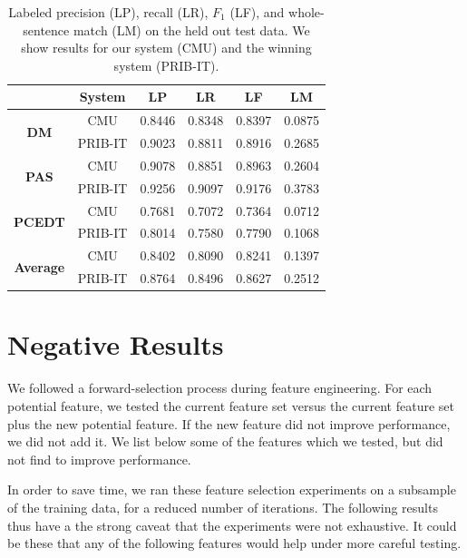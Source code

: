 \documentclass[11pt]{article}
\begin{document}
\begin{table}
\begin{center}
\begin{tabular*}{\textwidth}%
{@{\extracolsep{\fill}}cc|cccc}%
 & System & LP & LR & LF & LM \\
\hline
\hline
\multirow{2}{*}{\textbf{DM}}
& CMU & 0.8446 & 0.8348 & 0.8397 & 0.0875 \\
& PRIB-IT & 0.9023 & 0.8811 & 0.8916 & 0.2685 \\
\hline
\multirow{2}{*}{\textbf{PAS}}
& CMU & 0.9078 & 0.8851 & 0.8963 & 0.2604 \\
& PRIB-IT & 0.9256 & 0.9097 & 0.9176 & 0.3783 \\
\hline
\multirow{2}{*}{\textbf{PCEDT}}
& CMU & 0.7681 & 0.7072 & 0.7364 & 0.0712 \\
& PRIB-IT & 0.8014 & 0.7580 & 0.7790 & 0.1068 \\
\hline
\hline
\multirow{2}{*}{\textbf{Average}}
& CMU & 0.8402 & 0.8090 & 0.8241 & 0.1397 \\
& PRIB-IT & 0.8764 & 0.8496 & 0.8627 & 0.2512 \\
\end{tabular*}
\caption{Labeled precision (LP), recall (LR), $F_1$ (LF), and
whole-sentence match (LM) on the held out test data.
We show results for our system (CMU) and the winning system (PRIB-IT).
}
\label{table:perf}
\end{center}
\end{table}



\section{Negative Results}
\label{s:badfeatures}

We followed a forward-selection process during feature engineering.
For each potential feature, we tested the current feature set versus the current
feature set plus the new potential feature.
If the new feature did not improve performance, we did not add it.
We list below some of the features which we tested, but did not find to improve
performance.

In order to save time, we ran these feature selection experiments
on a subsample of the training data, for a reduced number of iterations.
The following results thus have a 
the strong caveat that the experiments were
not exhaustive.  It could be these that any of the following features would help under more careful testing.
\end{document}
